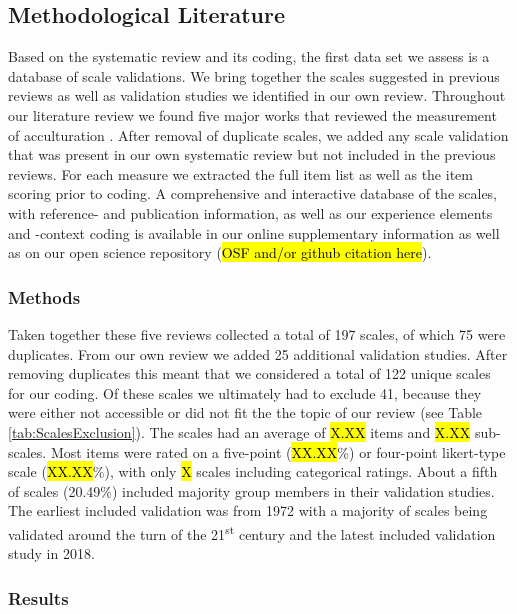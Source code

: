 \subsection{Methodological Literature}

Based on the systematic review and its coding, the first data set we
assess is a database of scale validations. We bring together the scales
suggested in previous reviews as well as validation studies we
identified in our own review. Throughout our literature review we found
five major works that reviewed the measurement of acculturation
\citep{Celenk2011, Maestas2000, Matsudaira2006, Wallace2010, Zane2004}.
After removal of duplicate scales, we added any scale validation that
was present in our own systematic review but not included in the
previous reviews. For each measure we extracted the full item list as
well as the item scoring prior to coding. A comprehensive and
interactive database of the scales, with reference- and publication
information, as well as our experience elements and -context coding is
available in our online supplementary information as well as on our open
science repository (\hl{OSF and/or github citation here}).

\subsubsection{Methods}

Taken together these five reviews collected a total of 197 scales, of
which 75 were duplicates. From our own review we added 25 additional
validation studies. After removing duplicates this meant that we
considered a total of 122 unique scales for our coding. Of these scales
we ultimately had to exclude 41, because they were either not accessible
or did not fit the the topic of our review (see Table
\ref{tab:ScalesExclusion}). The scales had an average of \hl{X.XX} items
and \hl{X.XX} sub-scales. Most items were rated on a five-point
(\hl{XX.XX}\%) or four-point likert-type scale (\hl{XX.XX}\%), with only
\hl{X} scales including categorical ratings. About a fifth of scales
(20.49\%) included majority group members in their validation studies.
The earliest included validation was from 1972 with a majority of scales
being validated around the turn of the 21\textsuperscript{st} century
and the latest included validation study in 2018.



\subsubsection{Results}

